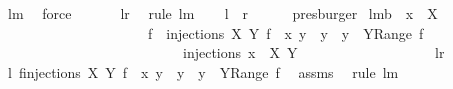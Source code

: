 \begin{isabellebody}
\ lm{}{}\ \isamarkupfalse%
\ force\ \isanewline
\ \ \isamarkupfalse%
\ \isamarkupfalse%
\ {\isachardoublequoteopen}{\isacharquery}l{\isacharprime}{\isacharequal}{\isacharquery}r{\isacharprime}{\isachardoublequoteclose}\ \isamarkupfalse%
\ {\isacharparenleft}rule\ lm{}{}{\isacharparenright}\ \isamarkupfalse%
\ \isamarkupfalse%
\ {\isachardoublequoteopen}{\isacharquery}l\ {\isacharequal}\ {\isacharquery}r{\isachardoublequoteclose}\ \isamarkupfalse%
\ {}\ {}\ \isamarkupfalse%
\ presburger\isanewline
{}\isamarkupfalse%
%
\endisatagproof
{\isafoldproof}%
%
\isadelimproof
\isanewline
%
\endisadelimproof
\isanewline
{}\isamarkupfalse%
\ lm{}{}b{\isacharcolon}\ \ {\isachardoublequoteopen}x\ {\isasymnotin}\ X{\isachardoublequoteclose}\ \isanewline
\ \ \ \ \ \ \ \ \ \ \ \ \ \ \ \ \ \ \ \ {\isachardoublequoteopen}{\isacharparenleft}{\isasymUnion}\ f\ {\isasymin}\ injections\ X\ Y{\isachardot}\ {\isacharbraceleft}f\ {\isacharplus}{\isacharasterisk}\ {\isacharbraceleft}{\isacharparenleft}x{\isacharcomma}\ y{\isacharparenright}{\isacharbraceright}\ {\isacharbar}\ y\ {\isachardot}\ y\ {\isasymin}\ Y{\isacharminus}Range\ f{\isacharbraceright}{\isacharparenright}\ {\isacharequal}\ \isanewline
\ \ \ \ \ \ \ \ \ \ \ \ \ \ \ \ \ \ \ \ \ \ \ \ \ \ injections\ {\isacharparenleft}{\isacharbraceleft}x{\isacharbraceright}\ {\isasymunion}\ X{\isacharparenright}\ Y{\isachardoublequoteclose}\ \isanewline
\ \ \ \ \ \ \ \ \ \ \ \ \ \ \ \ \ {\isacharparenleft}\ {\isachardoublequoteopen}{\isacharquery}l{\isacharequal}{\isacharquery}r{\isachardoublequoteclose}{\isacharparenright}\isanewline
%
\isadelimproof
%
\endisadelimproof
%
\isatagproof
{}\isamarkupfalse%
\ {\isacharminus}\ \isanewline
\ \ \isamarkupfalse%
\ {\isachardoublequoteopen}{\isacharquery}l{\isacharequal}{\isacharparenleft}{\isasymUnion}\ f{\isasymin}injections\ X\ Y{\isachardot}\ {\isacharbraceleft}f\ {\isasymunion}\ {\isacharbraceleft}{\isacharparenleft}x{\isacharcomma}\ y{\isacharparenright}{\isacharbraceright}\ {\isacharbar}\ y\ {\isachardot}\ y\ {\isasymin}\ Y{\isacharminus}Range\ f{\isacharbraceright}{\isacharparenright}{\isachardoublequoteclose}\ \isamarkupfalse%
\ assms\ \isamarkupfalse%
\ {\isacharparenleft}rule\ lm{}{}{\isacharparenright}\isanewline

\end{isabellebody}
